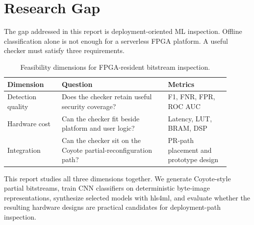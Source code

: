 \section{Research Gap}
\label{sec:research-gap}


The gap addressed in this report is deployment-oriented ML inspection. Offline classification alone is not enough for a serverless FPGA platform. A useful checker must satisfy three requirements.

\begin{table}[H]
    \centering
    \caption{Feasibility dimensions for FPGA-resident bitstream inspection.}
    \label{tab:feasibility-dimensions}
    \begin{tabular}{p{0.22\linewidth} p{0.43\linewidth} p{0.25\linewidth}}
        \toprule
        \textbf{Dimension} & \textbf{Question} & \textbf{Metrics} \\
        \midrule
        Detection quality &
        Does the checker retain useful security coverage? &
        F1, FNR, FPR, ROC AUC \\
        \midrule
        Hardware cost &
        Can the checker fit beside platform and user logic? &
        Latency, LUT, BRAM, DSP \\
        \midrule
        Integration &
        Can the checker sit on the Coyote partial-reconfiguration path? &
        PR-path placement and prototype design \\
        \bottomrule
    \end{tabular}
\end{table}



This report studies all three dimensions together. We generate Coyote-style partial bitstreams, train CNN classifiers on deterministic byte-image representations, synthesize selected models with hls4ml, and evaluate whether the resulting hardware designs are practical candidates for deployment-path inspection.
